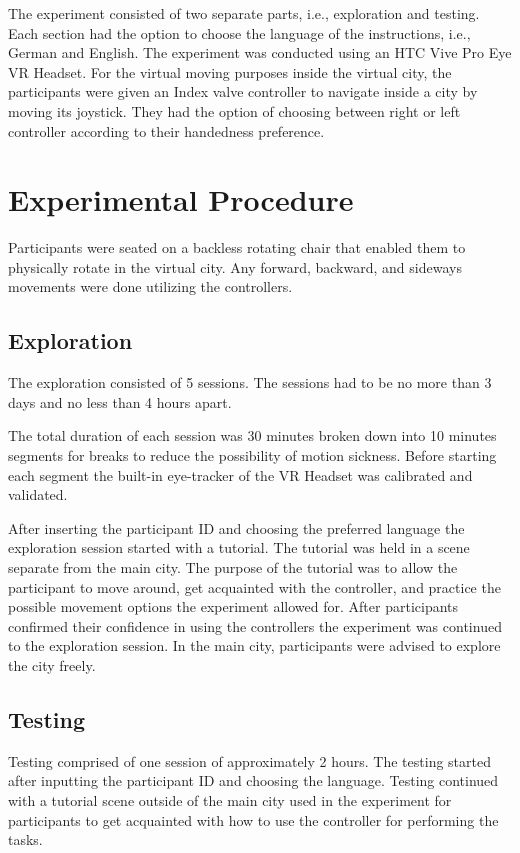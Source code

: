 The experiment consisted of two separate parts, i.e., exploration and testing.  Each section had the option to choose the language of the instructions, i.e., German and English. The experiment was conducted using an HTC Vive Pro Eye VR Headset. For the virtual moving purposes inside the virtual city, the participants were given an Index valve controller to navigate inside a city by moving its joystick. They had the option of choosing between right or left controller according to their handedness preference.

\section{Experimental Procedure}

Participants were seated on a backless rotating chair that enabled them to physically rotate in the virtual city. Any forward, backward, and sideways movements were done utilizing the controllers.

\subsection{Exploration}

The exploration consisted of 5 sessions. The sessions had to be no more than 3 days and no less than 4 hours apart. 

The total duration of each session was 30 minutes broken down into 10 minutes segments for breaks to reduce the possibility of motion sickness. Before starting each segment the built-in eye-tracker of the VR Headset was calibrated and validated. 

After inserting the participant ID and choosing the preferred language the exploration session started with a tutorial. The tutorial was held in a scene separate from the main city. The purpose of the tutorial was to allow the participant to move around, get acquainted with the controller, and practice the possible movement options the experiment allowed for. After participants confirmed their confidence in using the controllers the experiment was continued to the exploration session. In the main city, participants were advised to explore the city freely.

\subsection{Testing}

Testing comprised of one session of approximately 2 hours. The testing started after inputting the participant ID and choosing the language. Testing continued with a tutorial scene outside of the main city used in the experiment for participants to get acquainted with how to use the controller for performing the tasks. 


